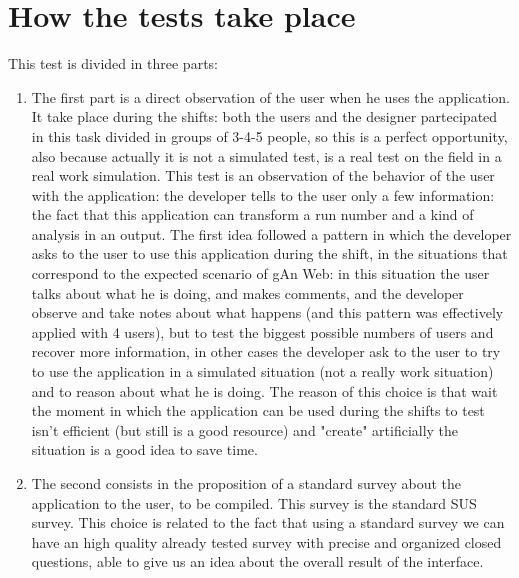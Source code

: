 \section{How the tests take place} 

This test is divided in three parts: 
\begin{enumerate}
\item
The first part is a direct observation of the user when he uses the application. It take place during the shifts: both the users and the designer partecipated in this task divided in groups of 3-4-5 people, so this is a perfect opportunity, also because actually it is not a simulated test, is a real test on the field in a real work simulation. This test is an observation of the behavior of the user with the application: the developer tells to the user only a few information: the fact that this application can transform a run number and a kind of analysis in an output. 
The first idea followed a pattern in which the developer asks to the user to use this application during the shift, in the situations that correspond to the expected scenario of gAn Web: in this situation the user talks about what he is doing, and makes comments, and the developer observe and take notes about what happens (and this pattern was effectively applied with 4 users), but to test the biggest possible numbers of users and recover more information, in other cases the developer ask to the user to try to use the application in a simulated situation (not a really work situation) and to reason about what he is doing. The reason of this choice is that wait the moment in which the application can be used during the shifts to test isn't efficient (but still is a good resource) and "create" artificially the situation is a good idea to save time.

\item
The second consists in the proposition of a standard survey about the application to the user, to be compiled. This survey is the standard SUS survey. This choice is related to the fact that using a standard survey we can have an high quality already tested survey with precise and organized closed questions, able to give us an idea about the overall result of the interface. 


\end{enumerate}
